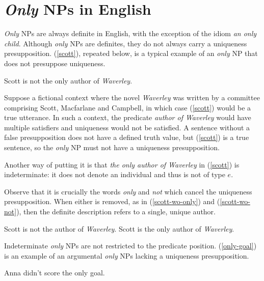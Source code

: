 \section{\textit{Only} NPs in English \label{sec:only-nps-english}}
\textit{Only} NPs are always definite in English, with the exception of the idiom \textit{an only child}. Although \textit{only} NPs are definites, they do not always carry a uniqueness presupposition. (\ref{scott}), repeated below, is a typical example of an \textit{only} NP that does not presuppose uniqueness.


\begin{exe}
	 Scott is not the only author of \textit{Waverley}.
\end{exe}

Suppose a fictional context where the novel \textit{Waverley} was written by a committee comprising Scott, Macfarlane and Campbell, in which case (\ref{scott}) would be a true utterance. In such a context, the predicate \textit{author of Waverley} would have multiple satisfiers and uniqueness would not be satisfied. A sentence without a false presupposition does not have a defined truth value, but (\ref{scott}) is a true sentence, so the \textit{only} NP must not have a uniqueness presupposition.

Another way of putting it is that \textit{the only author of Waverley} in (\ref{scott}) is indeterminate: it does not denote an individual and thus is not of type $e$.

Observe that it is crucially the words \textit{only} and \textit{not} which cancel the uniqueness presupposition. When either is removed, as in (\ref{scott-wo-only}) and (\ref{scott-wo-not}), then the definite description refers to a single, unique author.

\begin{exe}
	\ex \label{scott-wo-only} Scott is not the author of \textit{Waverley}.
	\ex \label{scott-wo-not} Scott is the only author of \textit{Waverley}.
\end{exe}

Indeterminate \textit{only} NPs are not restricted to the predicate position. (\ref{only-goal}) is an example of an argumental \textit{only} NPs lacking a uniqueness presupposition.

\begin{exe}
	\ex \label{only-goal} Anna didn't score the only goal.
\end{exe}

